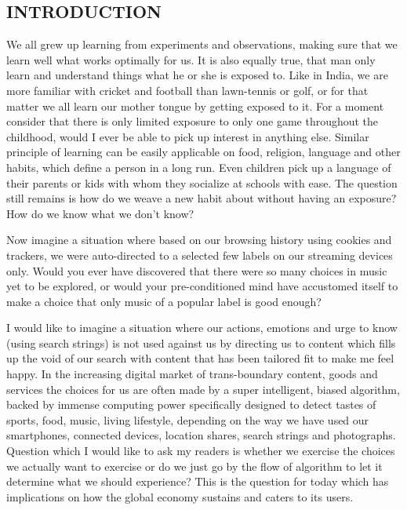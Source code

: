 \begin{multicols}{2}

\section{INTRODUCTION}

We all grew up learning from experiments and observations, making sure that we learn well what works optimally for us. It is also equally true, that man only learn and understand things what he or she is exposed to. Like in India, we are more familiar with cricket and football than lawn-tennis or golf, or for that matter we all learn our mother tongue by getting exposed to it. For a moment consider that there is only limited exposure to only one game throughout the childhood, would I ever be able to pick up interest in anything else. Similar principle of learning can be easily applicable on food, religion, language and other habits, which define a person in a long run. Even children pick up a language of their parents or kids with whom they socialize at schools with ease. The question still remains is how do we weave a new habit about without having an exposure? How do we know what we don’t know? 

Now imagine a situation where based on our browsing history using cookies and trackers, we were auto-directed to a selected few labels on our streaming devices only. Would you ever have discovered that there were so many choices in music yet to be explored, or would your pre-conditioned mind have accustomed itself to make a choice that only music of a popular label is good enough? 

I would like to imagine a situation where our actions, emotions and urge to know (using search strings) is not used against us by directing us to content which fills up the void of our search with content that has been tailored fit to make me feel happy. In the increasing digital market of trans-boundary content, goods and services the choices for us are often made by a super intelligent, biased algorithm, backed by immense computing power specifically designed to detect tastes of sports, food, music, living lifestyle, depending on the way we have used our smartphones, connected devices, location shares, search strings and photographs. Question which I would like to ask my readers is whether we exercise the choices we actually want to exercise or do we just go by the flow of algorithm to let it determine what we should experience? This is the question for today which has implications on how the global economy sustains and caters to its users. 


\end{multicols}
